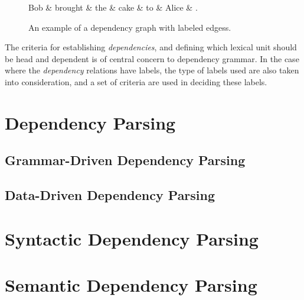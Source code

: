 \begin{figure}
    \begin{dependency}[]
        \begin{deptext}[column sep=1em, row sep=.1ex]
            Bob \& brought \& the \& cake \& to \& Alice \& . \\
        \end{deptext}
    \end{dependency}
    \caption{An example of a dependency graph with labeled edgess.}
    \label{dep1}
\end{figure}

The criteria for establishing \textit{dependencies}, and defining which lexical unit should be head and dependent is of central concern to dependency grammar. In the case where the \textit{dependency} relations have labels, the type of labels used are also taken into consideration, and a set of criteria are used in deciding these labels. 



\section{Dependency Parsing}
\subsection{Grammar-Driven Dependency Parsing}
\subsection{Data-Driven Dependency Parsing}


\section{Syntactic Dependency Parsing}


\section{Semantic Dependency Parsing}





